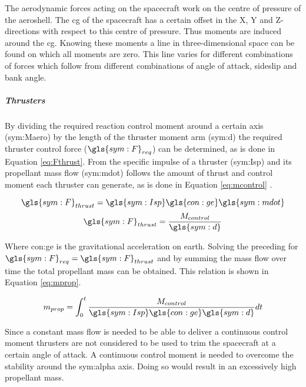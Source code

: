 The aerodynamic forces acting on the spacecraft work on the centre of pressure of the aeroshell. The \gls{cg} of the spacecraft has a certain offset in the X, Y and Z-directions with respect to this centre of pressure. Thus moments are induced around the \gls{cg}. Knowing these moments a line in three-dimensional space can be found on which all moments are zero. This line varies for different combinations of forces which follow from different combinations of angle of attack, sideslip and bank angle.

\subparagraph{Thrusters}
\label{subpar:thrusters}

By dividing the required reaction control moment around a certain axis (\gls{sym:Maero}) by the length of the thruster moment arm (\gls{sym:d}) the required thruster control force ($\gls{sym:F}_{req}$) can be determined, as is done in Equation \ref{eq:Fthrust}. From the specific impulse of a thruster (\gls{sym:Isp}) and its propellant mass flow (\gls{sym:mdot}) follows the amount of thrust and control moment each thruster can generate, as is done in Equation \ref{eq:mcontrol} \cite{Allen2012}.
\begin{multicols}{2}
\begin{equation}
\gls{sym:F}_{thrust}=\gls{sym:Isp}\gls{con:ge}\gls{sym:mdot}
\label{eq:Fthrust}
\end{equation}
\begin{equation} \label{eq:mcontrol}
\gls{sym:F}_{thrust}=\frac{M_{control}}{\gls{sym:d}}
\end{equation}
\end{multicols}
Where \gls{con:ge} is the gravitational acceleration on earth. Solving the preceding for $\gls{sym:F}_{req}=\gls{sym:F}_{thrust}$ and by summing the mass flow over time the total propellant mass can be obtained. This relation is shown in Equation \ref{eq:mprop}.

\begin{equation}
m_{prop} = \int_{0}^{t} \frac{M_{control}}{\gls{sym:Isp}\gls{con:ge}\gls{sym:d}} dt
\label{eq:mprop}
\end{equation}

Since a constant mass flow is needed to be able to deliver a continuous control moment thrusters are not considered to be used to trim the spacecraft at a certain angle of attack. A continuous control moment is needed to overcome the stability around the \gls{sym:alpha} axis. Doing so would result in an excessively high propellant mass.

